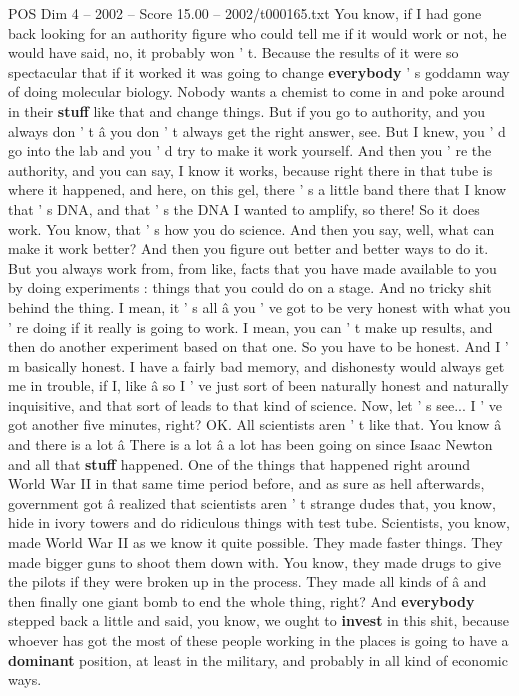 \begin{textsample}{POS Dim 4 – 2002 – Score 15.00 – 2002/t000165.txt}
You know, if I had gone back looking for an authority figure who could tell me if it would work or not, he would have said, no, it probably won ' t.
Because the results of it were so spectacular that if it worked it was going to change \textbf{everybody} ' s goddamn way of doing molecular biology.
Nobody wants a chemist to come in and poke around in their \textbf{stuff} like that and change things.
But if you go to authority, and you always don ' t â you don ' t always get the right answer, see.
But I knew, you ' d go into the lab and you ' d try to make it work yourself.
And then you ' re the authority, and you can say, I know it works, because right there in that tube is where it happened, and here, on this gel, there ' s a little band there that I know that ' s DNA, and that ' s the DNA I wanted to amplify, so there!
So it does work.
You know, that ' s how you do science.
And then you say, well, what can make it work better?
And then you figure out better and better ways to do it.
But you always work from, from like, facts that you have made available to you by doing experiments : things that you could do on a stage.
And no tricky shit behind the thing.
I mean, it ' s all â you ' ve got to be very honest with what you ' re doing if it really is going to work.
I mean, you can ' t make up results, and then do another experiment based on that one.
So you have to be honest.
And I ' m basically honest.
I have a fairly bad memory, and dishonesty would always get me in trouble, if I, like â so I ' ve just sort of been naturally honest and naturally inquisitive, and that sort of leads to that kind of science.
Now, let ' s see...
I ' ve got another five minutes, right?
OK.
All scientists aren ' t like that.
You know â and there is a lot â There is a lot â a lot has been going on since Isaac Newton and all that \textbf{stuff} happened.
One of the things that happened right around World War II in that same time period before, and as sure as hell afterwards, government got â realized that scientists aren ' t strange dudes that, you know, hide in ivory towers and do ridiculous things with test tube.
Scientists, you know, made World War II as we know it quite possible.
They made faster things.
They made bigger guns to shoot them down with.
You know, they made drugs to give the pilots if they were broken up in the process.
They made all kinds of â and then finally one giant bomb to end the whole thing, right?
And \textbf{everybody} stepped back a little and said, you know, we ought to \textbf{invest} in this shit, because whoever has got the most of these people working in the places is going to have a \textbf{dominant} position, at least in the military, and probably in all kind of economic ways.

\end{textsample}
